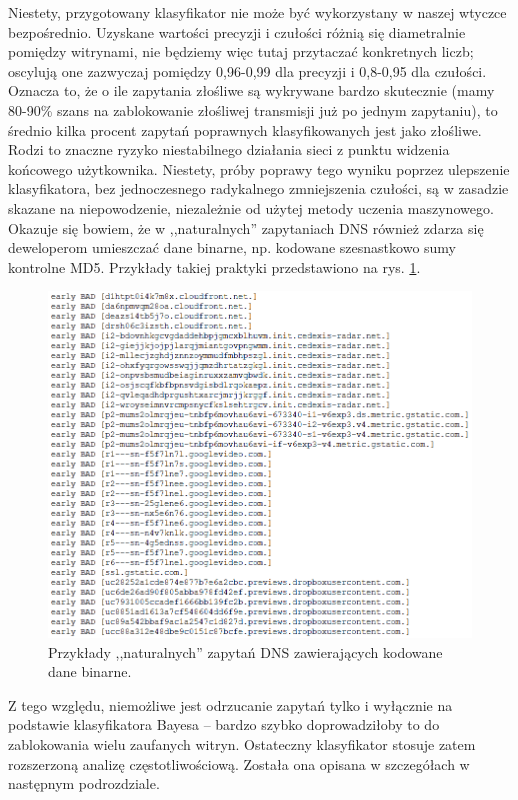 \documentclass{eiti-raport}
\begin{document}
Niestety, przygotowany klasyfikator nie może być wykorzystany w naszej wtyczce bezpośrednio. Uzyskane wartości precyzji i czułości różnią się diametralnie pomiędzy witrynami, nie będziemy więc tutaj przytaczać konkretnych liczb; oscylują one zazwyczaj pomiędzy 0,96-0,99 dla precyzji i 0,8-0,95 dla czułości. Oznacza to, że o ile zapytania złośliwe są wykrywane bardzo skutecznie (mamy 80-90\% szans na zablokowanie złośliwej transmisji już po jednym zapytaniu), to średnio kilka procent zapytań poprawnych klasyfikowanych jest jako złośliwe. Rodzi to znaczne ryzyko niestabilnego działania sieci z punktu widzenia końcowego użytkownika. Niestety, próby poprawy tego wyniku poprzez ulepszenie klasyfikatora, bez jednoczesnego radykalnego zmniejszenia czułości, są w zasadzie skazane na niepowodzenie, niezależnie od użytej metody uczenia maszynowego. Okazuje się bowiem, że w ,,naturalnych'' zapytaniach DNS również zdarza się deweloperom umieszczać dane binarne, np. kodowane szesnastkowo sumy kontrolne MD5. Przykłady takiej praktyki przedstawiono na rys. \ref{fig:badlog}. 
\begin{figure}[!h] \centering
	\includegraphics[width=0.95\linewidth]{img/badlog.PNG}
	\caption{Przykłady ,,naturalnych'' zapytań DNS zawierających kodowane dane binarne.} \label{fig:badlog}
\end{figure}

Z tego względu, niemożliwe jest odrzucanie zapytań tylko i wyłącznie na podstawie klasyfikatora Bayesa -- bardzo szybko doprowadziłoby to do zablokowania wielu zaufanych witryn. Ostateczny klasyfikator stosuje zatem rozszerzoną analizę częstotliwościową. Została ona opisana w szczegółach w następnym podrozdziale. 
\end{document}
